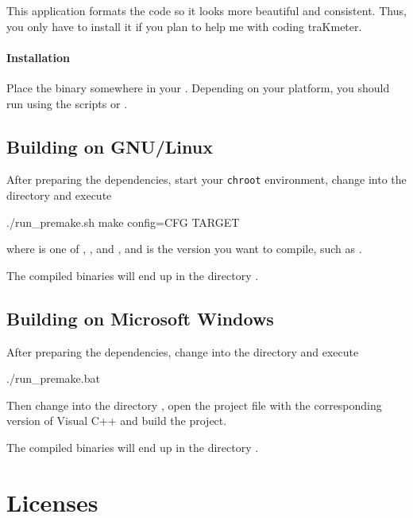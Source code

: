 This application formats the code so it looks more beautiful and
consistent.  Thus, you only have to install it if you plan to help me
with coding traKmeter.

\subsubsection{Installation}

Place the binary somewhere in your .  Depending on your
platform, you should run  using the scripts
 or .

\section{Building on GNU/Linux}

After preparing the dependencies, start your \texttt{chroot}
environment, change into the directory  and execute

\begin{VerbatimBoth}
  ./run_premake.sh
  make config=CFG TARGET
\end{VerbatimBoth}

where  is one of ,
,  and
, and  is the version you
want to compile, such as .

The compiled binaries will end up in the directory .

\section{Building on Microsoft Windows}

After preparing the dependencies, change into the directory
 and execute

\begin{VerbatimBoth}
  ./run_premake.bat
\end{VerbatimBoth}

Then change into the directory , open the
project file with the corresponding version of Visual C++ and build
the project.

The compiled binaries will end up in the directory .

\chapter{Licenses}

\scriptsize

\normalsize

\scriptsize

\normalsize




